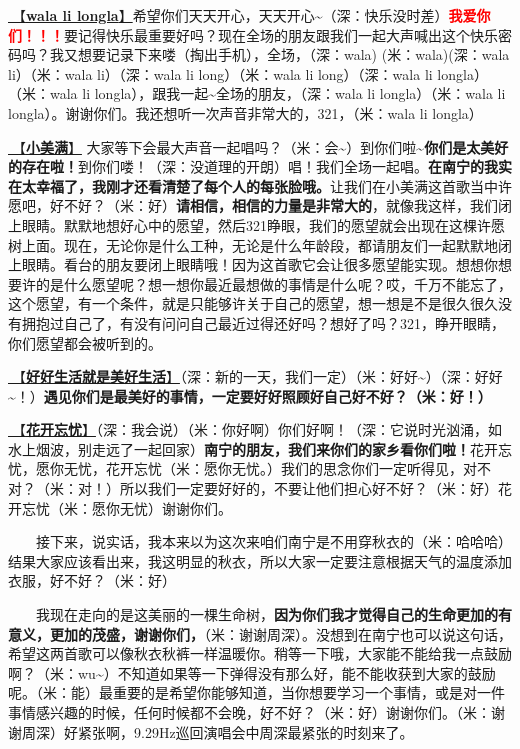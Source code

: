 \documentclass[]{ctexbook}
\begin{document}
\hyperref[wala-li-longla]{🎵【\textbf{wala li longla}】}希望你们天天开心，天天开心\textasciitilde（深：快乐没时差）\textbf{\textcolor{red}{我爱你们！！！}}要记得快乐最重要好吗？现在全场的朋友跟我们一起大声喊出这个快乐密码吗？我又想要记录下来喽（掏出手机），全场，（深：wala) (米：wala)(深：wala li）（米：wala li）（深：wala li long）（米：wala li long）（深：wala li longla）（米：wala li longla），跟我一起\textasciitilde 全场的朋友，（深：wala li longla）（米：wala li longla）。谢谢你们。我还想听一次声音非常大的，321，（米：wala li longla）

\hyperref[happy-ending]{🎵【\textbf{小美满}】} 大家等下会最大声音一起唱吗？（米：会\textasciitilde）到你们啦\textasciitilde{}\textbf{你们是太美好的存在啦！}到你们喽！（深：没道理的开朗）唱！我们全场一起唱。\textbf{在南宁的我实在太幸福了，我刚才还看清楚了每个人的每张脸哦。}让我们在小美满这首歌当中许愿吧，好不好？（米：好）\textbf{请相信，相信的力量是非常大的}，就像我这样，我们闭上眼睛。默默地想好心中的愿望，然后321睁眼，我们的愿望就会出现在这棵许愿树上面。现在，无论你是什么工种，无论是什么年龄段，都请朋友们一起默默地闭上眼睛。看台的朋友要闭上眼睛哦！因为这首歌它会让很多愿望能实现。想想你想要许的是什么愿望呢？想一想你最近最想做的事情是什么呢？哎，千万不能忘了，这个愿望，有一个条件，就是只能够许关于自己的愿望，想一想是不是很久很久没有拥抱过自己了，有没有问问自己最近过得还好吗？想好了吗？321，睁开眼睛，你们愿望都会被听到的。

\hyperref[live-happy-life-happy]{🎵【\textbf{好好生活就是美好生活}】}（深：新的一天，我们一定）（米：好好\textasciitilde）（深：好好\textasciitilde！）\textbf{遇见你们是最美好的事情，一定要好好照顾好自己好不好？（米：好！）}

\hyperref[no-worries]{🎵【\textbf{花开忘忧}】}（深：我会说）（米：你好啊）你们好啊！（深：它说时光汹涌，如水上烟波，别走远了一起回家）\textbf{南宁的朋友，我们来你们的家乡看你们啦！}花开忘忧，愿你无忧，花开忘忧（米：愿你无忧。）我们的思念你们一定听得见，对不对？（米：对！）所以我们一定要好好的，不要让他们担心好不好？（米：好）花开忘忧（米：愿你无忧）谢谢你们。

  接下来，说实话，我本来以为这次来咱们南宁是不用穿秋衣的（米：哈哈哈）结果大家应该看出来，我这明显的秋衣，所以大家一定要注意根据天气的温度添加衣服，好不好？（米：好）

  我现在走向的是这美丽的一棵生命树，\textbf{因为你们我才觉得自己的生命更加的有意义，更加的茂盛，谢谢你们，}（米：谢谢周深）。没想到在南宁也可以说这句话，希望这两首歌可以像秋衣秋裤一样温暖你。稍等一下哦，大家能不能给我一点鼓励啊？（米：wu\textasciitilde）不知道如果等一下弹得没有那么好，能不能收获到大家的鼓励呢。（米：能）最重要的是希望你能够知道，当你想要学习一个事情，或是对一件事情感兴趣的时候，任何时候都不会晚，好不好？（米：好）谢谢你们。（米：谢谢周深）好紧张啊，9.29Hz巡回演唱会中周深最紧张的时刻来了。
\end{document}
